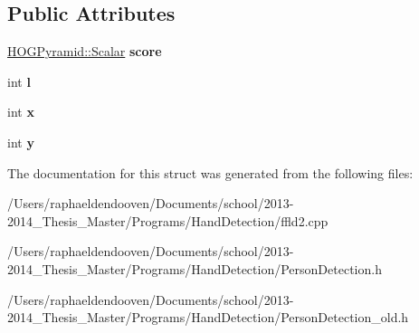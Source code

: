 \subsection*{Public Attributes}
\begin{DoxyCompactItemize}
\item 
\hypertarget{struct_detection_a6bb0acb0597ec67b7049c2560c6c7783}{\hyperlink{class_f_f_l_d_1_1_h_o_g_pyramid_af17c08ed86557e0a0aecb4814daf87c3}{H\-O\-G\-Pyramid\-::\-Scalar} {\bfseries score}}\label{struct_detection_a6bb0acb0597ec67b7049c2560c6c7783}

\item 
\hypertarget{struct_detection_a08b01da4f3061254d1647bf737b172ed}{int {\bfseries l}}\label{struct_detection_a08b01da4f3061254d1647bf737b172ed}

\item 
\hypertarget{struct_detection_a7b71921325261514cd6dd42c8e90ba70}{int {\bfseries x}}\label{struct_detection_a7b71921325261514cd6dd42c8e90ba70}

\item 
\hypertarget{struct_detection_afa5d065ea13ce74dfd52c6a569313270}{int {\bfseries y}}\label{struct_detection_afa5d065ea13ce74dfd52c6a569313270}

\end{DoxyCompactItemize}


The documentation for this struct was generated from the following files\-:\begin{DoxyCompactItemize}
\item 
/\-Users/raphaeldendooven/\-Documents/school/2013-\/2014\-\_\-\-Thesis\-\_\-\-Master/\-Programs/\-Hand\-Detection/ffld2.\-cpp\item 
/\-Users/raphaeldendooven/\-Documents/school/2013-\/2014\-\_\-\-Thesis\-\_\-\-Master/\-Programs/\-Hand\-Detection/Person\-Detection.\-h\item 
/\-Users/raphaeldendooven/\-Documents/school/2013-\/2014\-\_\-\-Thesis\-\_\-\-Master/\-Programs/\-Hand\-Detection/Person\-Detection\-\_\-old.\-h\end{DoxyCompactItemize}
